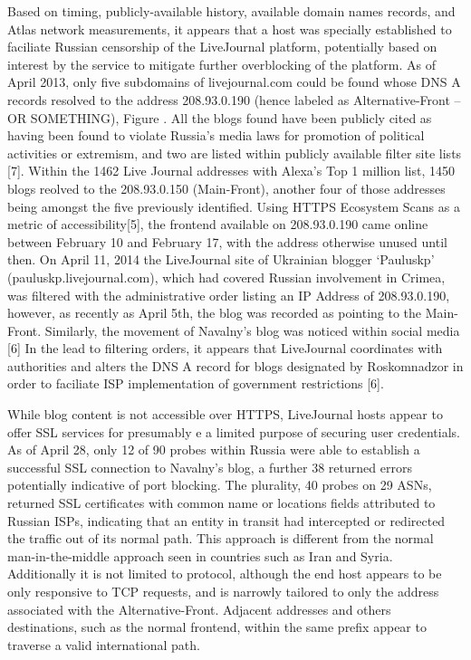 Based on timing, publicly-available history, available domain names records, and Atlas network measurements, it appears that a host was specially established to faciliate Russian censorship of the LiveJournal platform, potentially based on interest by the service to mitigate further overblocking of the platform. As of April 2013, only five subdomains of livejournal.com could be found whose DNS A records resolved to the address 208.93.0.190 (hence labeled as Alternative-Front -- OR SOMETHING), Figure \cite{lj-blocked-blogs}. All the blogs found have been publicly cited as having been found to violate Russia's media laws for promotion of political activities or extremism, and two are listed within publicly available filter site lists [7]. Within the 1462 Live Journal addresses with Alexa's Top 1 million list, 1450 blogs reolved to the 208.93.0.150 (Main-Front), another four of those addresses being amongst the five previously identified. Using HTTPS Ecosystem Scans as a metric of accessibility[5], the frontend available on 208.93.0.190 came online between February 10 and February 17, with the address otherwise unused until then. On April 11, 2014 the LiveJournal site of Ukrainian blogger `Pauluskp' (pauluskp.livejournal.com), which had covered Russian involvement in Crimea, was filtered with the administrative order listing an IP Address of 208.93.0.190, however, as recently as April 5th, the blog was recorded as pointing to the Main-Front. Similarly, the movement of Navalny's blog was noticed within social media [6] In the lead to filtering orders, it appears that LiveJournal coordinates with authorities and alters the DNS A record for blogs designated by Roskomnadzor in order to faciliate ISP implementation of government restrictions [6].

While blog content is not accessible over HTTPS, LiveJournal hosts appear to offer SSL services for presumably e a limited purpose of securing user credentials. As of April 28, only 12 of 90 probes within Russia were able to establish a successful SSL connection to Navalny's blog, a further 38 returned errors potentially indicative of port blocking. The plurality, 40 probes on 29 ASNs, returned SSL certificates with common name or locations fields attributed to Russian ISPs, indicating that an entity in transit had intercepted or redirected the traffic out of its normal path. This approach is different from the normal man-in-the-middle approach seen in countries such as Iran and Syria. Additionally it is not limited to protocol, although the end host appears to be only responsive to TCP requests, and is narrowly tailored to only the address associated with the Alternative-Front. Adjacent addresses and others destinations, such as the normal frontend, within the same prefix appear to traverse a valid international path.


